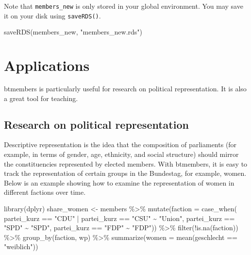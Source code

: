 \documentclass[12pt]{article}
\newenvironment{Shaded}{\begin{snugshade}}{\end{snugshade}}
\newcommand{\AttributeTok}[1]{\textcolor[rgb]{0.77,0.63,0.00}{#1}}
\newcommand{\FunctionTok}[1]{\textcolor[rgb]{0.00,0.00,0.00}{#1}}
\newcommand{\NormalTok}[1]{#1}
\newcommand{\OtherTok}[1]{\textcolor[rgb]{0.56,0.35,0.01}{#1}}
\newcommand{\SpecialCharTok}[1]{\textcolor[rgb]{0.00,0.00,0.00}{#1}}
\newcommand{\StringTok}[1]{\textcolor[rgb]{0.31,0.60,0.02}{#1}}
\begin{document}
Note that \texttt{members\_new} is only stored in your global
environment. You may save it on your disk using \texttt{saveRDS()}.

\begin{Shaded}
\begin{Highlighting}[]
\FunctionTok{saveRDS}\NormalTok{(members\_new, }\StringTok{"members\_new.rds"}\NormalTok{)}
\end{Highlighting}
\end{Shaded}

\hypertarget{applications}{%
\section{Applications}\label{applications}}

btmembers is particularly useful for research on political
representation. It is also a great tool for teaching.

\hypertarget{research-on-political-representation}{%
\subsection{Research on political
representation}\label{research-on-political-representation}}

Descriptive representation is the idea that the composition of
parliaments (for example, in terms of gender, age, ethnicity, and social
structure) should mirror the constituencies represented by elected
members. With btmembers, it is easy to track the representation of
certain groups in the Bundestag, for example, women. Below is an example
showing how to examine the representation of women in different factions
over time.

\begin{Shaded}
\begin{Highlighting}[]
\FunctionTok{library}\NormalTok{(dplyr)}
\NormalTok{share\_women }\OtherTok{\textless{}{-}}\NormalTok{ members }\SpecialCharTok{\%\textgreater{}\%}
  \FunctionTok{mutate}\NormalTok{(}\AttributeTok{faction =} \FunctionTok{case\_when}\NormalTok{(}
\NormalTok{    partei\_kurz }\SpecialCharTok{==} \StringTok{"CDU"} \SpecialCharTok{|}\NormalTok{ partei\_kurz }\SpecialCharTok{==} \StringTok{"CSU"} \SpecialCharTok{\textasciitilde{}} \StringTok{"Union"}\NormalTok{,}
\NormalTok{    partei\_kurz }\SpecialCharTok{==} \StringTok{"SPD"} \SpecialCharTok{\textasciitilde{}} \StringTok{"SPD"}\NormalTok{,}
\NormalTok{    partei\_kurz }\SpecialCharTok{==} \StringTok{"FDP"} \SpecialCharTok{\textasciitilde{}} \StringTok{"FDP"}\NormalTok{)) }\SpecialCharTok{\%\textgreater{}\%}
  \FunctionTok{filter}\NormalTok{(}\SpecialCharTok{!}\FunctionTok{is.na}\NormalTok{(faction)) }\SpecialCharTok{\%\textgreater{}\%}
  \FunctionTok{group\_by}\NormalTok{(faction, wp) }\SpecialCharTok{\%\textgreater{}\%}
  \FunctionTok{summarize}\NormalTok{(}\AttributeTok{women =} \FunctionTok{mean}\NormalTok{(geschlecht }\SpecialCharTok{==} \StringTok{"weiblich"}\NormalTok{))}
\end{Highlighting}
\end{Shaded}
\end{document}
